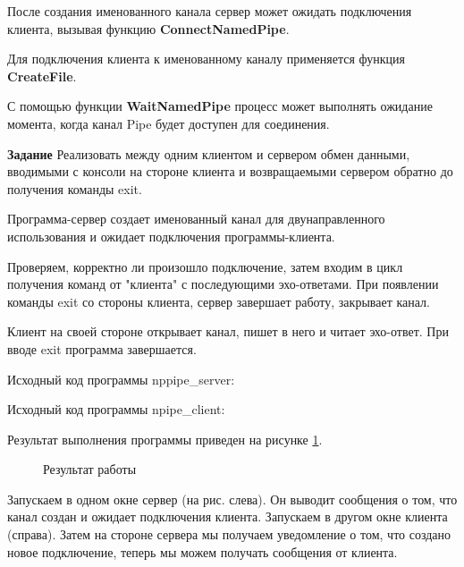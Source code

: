 \documentclass[a4paper]{article}
\begin{document}
	После создания именованного канала сервер может ожидать подключения клиента, вызывая функцию \textbf{ConnectNamedPipe}.
	
	Для подключения клиента к именованному каналу применяется функция \textbf{CreateFile}.
	
	С помощью функции \textbf{WaitNamedPipe} процесс может выполнять ожидание момента, когда канал Pipe будет доступен для соединения.
	
	\textbf{Задание} Реализовать между одним клиентом и сервером обмен данными, вводимыми с консоли на стороне клиента и возвращаемыми сервером обратно до получения команды exit.

	Программа-сервер создает именованный канал для двунаправленного использования и ожидает подключения программы-клиента.
	
	Проверяем, корректно ли произошло подключение, затем входим в цикл получения команд от "клиента" с последующими эхо-ответами. При появлении команды exit со стороны клиента, сервер завершает работу, закрывает канал.
	
	Клиент на своей стороне открывает канал, пишет в него и читает эхо-ответ. При вводе exit программа завершается.
	
	Исходный код программы nppipe\_server:
	
	
	Исходный код программы npipe\_client:
	
	
	Результат выполнения программы приведен на рисунке \ref{img:task3}.
	\begin{figure}[h!]
		\caption{Результат работы}
		\label{img:task3}
	\end{figure}
	
	Запускаем в одном окне сервер (на рис. слева). Он выводит сообщения о том, что канал создан и ожидает подключения клиента. Запускаем в другом окне клиента (справа). Затем на стороне сервера мы получаем уведомление о том, что создано новое подключение, теперь мы можем получать сообщения от клиента.
	
\end{document}
